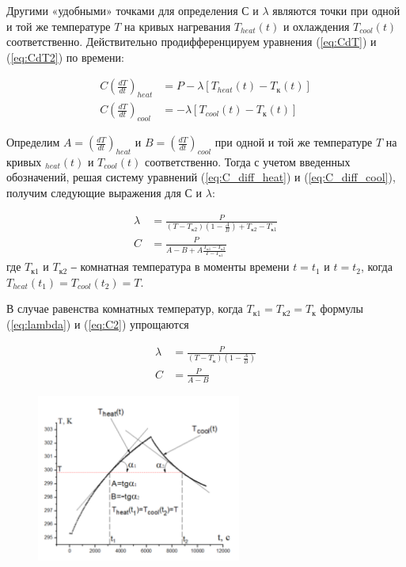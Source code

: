 \documentclass[a4paper, 12pt]{article}
\begin{document}
            Другими «удобными» точками для определения $С$ и $\lambda$ являются точки при одной и той же температуре $T$ на кривых нагревания $T_{heat}(t)$ и охлаждения $T_{cool}(t)$ соответственно. Действительно продифференцируем уравнения (\ref{eq:CdT}) и (\ref{eq:CdT2}) по времени:

            \begin{align}
                C \left( \frac{dT}{dt} \right)_{heat} &= P - \lambda \left[ T_{heat}(t) - T_к(t) \right] \label{eq:C_diff_heat}\\
                C \left( \frac{dT}{dt} \right)_{cool} &= - \lambda \left[ T_{cool}(t) - T_к(t) \right] \label{eq:C_diff_cool}
            \end{align}

            Определим $A = \left( \frac{dT}{dt} \right)_{heat}$ и $B = \left( \frac{dT}{dt} \right)_{cool}$ при одной и той же температуре $T$ на кривых $_{heat}(t)$ и $T_{cool}(t)$ соответственно. Тогда с учетом введенных обозначений, решая систему уравнений (\ref{eq:C_diff_heat}) и (\ref{eq:C_diff_cool}), получим следующие выражения для $С$ и $\lambda$:

            \begin{align}
                \lambda &= \frac{P}{(T - T_{к2})(1 - \frac{A}{B}) + T_{к2} - T_{к1}} \label{eq:lambda}\\
                C &= \frac{P}{A - B + A \frac{T_{к1} - T_{к2}}{T - T_{к1}}} \label{eq:C2}
            \end{align}
            где $T_{к1}$ и $T_{к2}$ ‒ комнатная температура в моменты времени $t = t_1$ и $t = t_2$, когда $T_{heat}(t_1) = T_{cool}(t_2) = T$.

            В случае равенства комнатных температур, когда $T_{к1} = T_{к2} = T_к$ формулы (\ref{eq:lambda}) и (\ref{eq:C2}) упрощаются

            \begin{align}
                \lambda &= \frac{P}{(T - T_к)(1 - \frac{A}{B})} \label{eq:lambda_fin}\\
                C &= \frac{P}{A - B} \label{eq:C_fin}
            \end{align}

            \begin{figure}[ht]
                \centering
                \includegraphics[width=0.6\textwidth]{img/diff_method.png}
            \end{figure}
\end{document}

